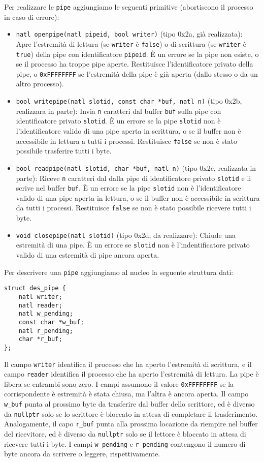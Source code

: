 Per realizzare le \verb|pipe| aggiungiamo le seguenti primitive (abortiscono il processo in caso di errore):
\begin{itemize}
   \item \verb|natl openpipe(natl pipeid, bool writer)| (tipo 0x2a, gi\`a realizzata):
   	Apre l'estremit\`a di lettura (se \verb|writer| \`e \verb|false|) o di scrittura
	(se \verb|writer| \`e \verb|true|) della pipe con identificatore \verb|pipeid|.
	\`E un errore se la pipe non esiste, o se il processo ha troppe pipe aperte.
	Restituisce l'identificatore privato della pipe, o \verb|0xFFFFFFFF| se l'estremit\`a
	della pipe \`e gi\`a aperta (dallo stesso o da un altro processo).
   \item \verb|bool writepipe(natl slotid, const char *buf, natl n)| (tipo 0x2b, realizzara in parte):
   	Invia \verb|n| caratteri dal buffer \verb|buf| sulla pipe con identificatore privato
	\verb|slotid|.  \`E un errore se la pipe \verb|slotid| non \`e l'identificatore
	valido di una pipe aperta in scrittura, o se il buffer non \`e accessibile in lettura 
	a tutti i processi.
	Restituisce \verb|false| se non \`e stato possibile trasferire tutti i byte.
   \item \verb|bool readpipe(natl slotid, char *buf, natl n)| (tipo 0x2c, realizzata in parte):
   	Riceve \verb|n| caratteri dal dalla pipe di identificatore privato \verb|slotid|
	e li scrive nel buffer \verb|buf|. 
	\`E un errore se la pipe \verb|slotid| non \`e l'identificatore
	valido di una pipe aperta in lettura, o se il buffer non \`e accessibile in scrittura 
	da tutti i processi.
	Restituisce \verb|false| se non \`e stato possibile ricevere tutti i byte.
   \item \verb|void closepipe(natl slotid)| (tipo 0x2d, da realizzare):
   	Chiude una estremit\`a di una pipe. \`E un errore se \verb|slotid| non \`e
	l'indentificatore privato valido di una estremit\`a di pipe ancora aperta.
\end{itemize}

Per descrivere una \verb|pipe| aggiungiamo al nucleo la seguente struttura dati:

\begin{verbatim}
struct des_pipe {
    natl writer;
    natl reader;
    natl w_pending;
    const char *w_buf;
    natl r_pending;
    char *r_buf;
};
\end{verbatim}
Il campo \verb|writer| identifica il processo che ha aperto l'estremit\`a di scrittura,
e il campo \verb|reader| identifica il processo che ha aperto l'estremit\`a di lettura.
La pipe \`e libera se entrambi sono zero. I campi assumono il valore \verb|0xFFFFFFFF|
se la corrispondente \`e estremit\`a \`e stata chiusa, ma l'altra \`e ancora aperta.
Il campo \verb|w_buf| punta al prossimo byte da trasferire dal buffer dello scrittore,
ed \`e diverso da \verb|nullptr| solo se lo scrittore \`e bloccato in attesa di completare
il trasferimento. Analogamente, il capo \verb|r_buf| punta alla prossima locazione da
riempire nel buffer del ricevitore, ed \`e diverso da \verb|nullptr| solo se il lettore
\`e bloccato in attesa di ricevere tutti i byte. I campi \verb|w_pending| e \verb|r_pending|
contengono il numero di byte ancora da scrivere o leggere, rispettivamente.

